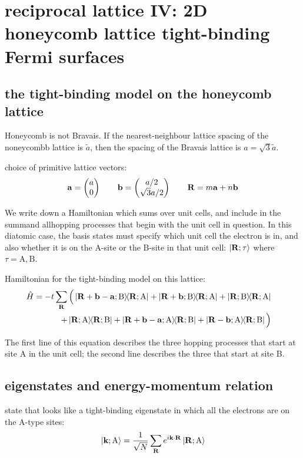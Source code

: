 \documentclass[10pt, a4paper, twocolumn]{article}
\begin{document}
\section{reciprocal lattice IV: 2D honeycomb lattice tight-binding Fermi surfaces}
\subsection{the tight-binding model on the honeycomb lattice}

Honeycomb is not Bravais. If the nearest-neighbour lattice spacing of the noneycombb lattice is $\tilde a$, then the spacing of the Bravais lattice is $a=\sqrt 3\tilde a$.

choice of primitive lattice vectors:
\[\vb a =\pmqty{a\\0}
\qquad \vb b = \pmqty{a/2\\\sqrt 3 a/2}
\qquad \vb R= m\vb a + n\vb b \]

We write down a Hamiltonian which sums over unit cells, and include in the summand allhopping processes that begin with the unit cell in question. In this diatomic case, the basis states must specify which unit cell the electron is in, and also whether it is on the A-site or the B-site in that unit cell: $\ket{\vb R;\tau}$ where $\tau =\mathrm{A, B}$.

Hamiltonian for the tight-binding model on this lattice:
\begin{equation*}
\begin{split}
\hspace{-1em} \hat H = -t \sum _{\vb R} \Big(
\dyad{\vb R +\vb b - \vb a ;\mathrm B}{\vb R;\mathrm A}
+\dyad{\vb R +\vb b;\mathrm B}{\vb R;\mathrm A}
+\dyad{\vb R;\mathrm B}{\vb R;\mathrm A}
\\+\dyad{\vb R;\mathrm A}{\vb R;\mathrm B}
+\dyad{\vb R +\vb b - \vb a ;\mathrm A}{\vb R;\mathrm B}
+\dyad{\vb R -\vb b;\mathrm A}{\vb R;\mathrm B}
\Big)
\end{split}
\end{equation*}

The first line of this equation describes the three hopping processes that start at site A in the unit cell; the second line describes the three that start at site B.

\subsection{eigenstates and energy-momentum relation}

state that looks like a tight-binding eigenstate in which all the electrons are on the A-type sites:
\[\ket{\vb k;\mathrm A}
=\frac{1}{\sqrt N}
\sum _{\vb R}e^{i\vb k\cdot \vb R}
\ket{\vb R;\mathrm A} \]
\end{document}
